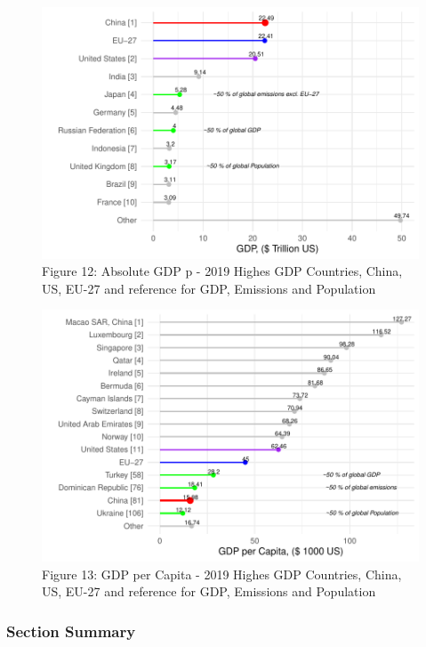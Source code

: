 \documentclass[
  12pt,
]{article}
\numberwithin{equation}{section}
\numberwithin{table}{section}
\numberwithin{figure}{section}
\begin{document}
\begin{figure}
\centering
\includegraphics{Paper_files/figure-latex/unnamed-chunk-15-1.pdf}
\caption{Figure 12: Absolute GDP p - 2019 \textbar{} Highes GDP
Countries, China, US, EU-27 and reference for GDP, Emissions and
Population}
\end{figure}

\begin{figure}
\centering
\includegraphics{Paper_files/figure-latex/unnamed-chunk-16-1.pdf}
\caption{Figure 13: GDP per Capita - 2019 \textbar{} Highes GDP
Countries, China, US, EU-27 and reference for GDP, Emissions and
Population}
\end{figure}

\hypertarget{section-summary-1}{%
\subsubsection{Section Summary}\label{section-summary-1}}
\end{document}
